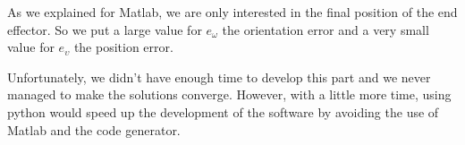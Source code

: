  As we explained for Matlab, we are only interested in the final position of the end effector. So we put a large value for $e_\omega$ the orientation error and a very small value for $e_\upsilon$ the position error.
 
 \bigbreak
 Unfortunately, we didn't have enough time to develop this part and we never managed to make the solutions converge. However, with a little more time, using python would speed up the development of the software by avoiding the use of Matlab and the code generator.